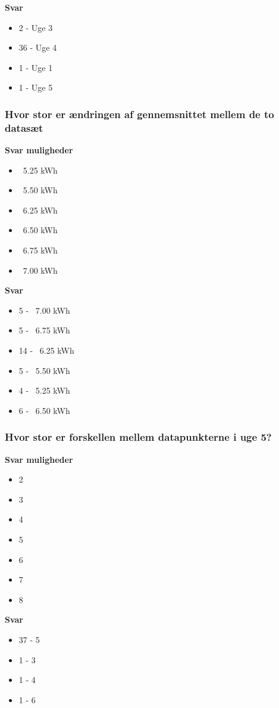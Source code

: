 \textbf{Svar}
\begin{itemize}
    \item 2 - Uge 3
    \item 36 - Uge 4
    \item 1 - Uge 1
    \item 1 - Uge 5
\end{itemize}

\subsubsection{Hvor stor er ændringen af gennemsnittet mellem de to datasæt}
\textbf{Svar muligheder}
\begin{itemize}
    \item ~5.25 kWh
    \item ~5.50 kWh
    \item ~6.25 kWh
    \item ~6.50 kWh
    \item ~6.75 kWh
    \item ~7.00 kWh
\end{itemize}

\textbf{Svar}
\begin{itemize}
    \item 5 - ~7.00 kWh
    \item 5 - ~6.75 kWh
    \item 14 - ~6.25 kWh
    \item 5 - ~5.50 kWh
    \item 4 - ~5.25 kWh
    \item 6 - ~6.50 kWh
\end{itemize}

\subsubsection{Hvor stor er forskellen mellem datapunkterne i uge 5?}
\textbf{Svar muligheder}
\begin{itemize}
    \item 2
    \item 3
    \item 4
    \item 5
    \item 6
    \item 7
    \item 8
\end{itemize}

\textbf{Svar}
\begin{itemize}
    \item 37 - 5
    \item 1 - 3
    \item 1 - 4
    \item 1 - 6
\end{itemize}

